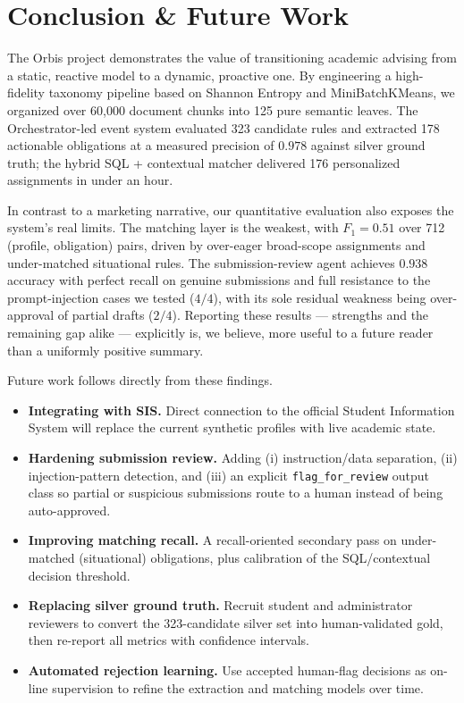 \documentclass[a4paper,12pt]{article}
\begin{document}
\section{Conclusion \& Future Work}
The Orbis project demonstrates the value of transitioning academic advising from a static, reactive model to a dynamic, proactive one. By engineering a high-fidelity taxonomy pipeline based on Shannon Entropy and MiniBatchKMeans, we organized over 60{,}000 document chunks into 125 pure semantic leaves. The Orchestrator-led event system evaluated 323 candidate rules and extracted 178 actionable obligations at a measured precision of $0.978$ against silver ground truth; the hybrid SQL + contextual matcher delivered 176 personalized assignments in under an hour.

In contrast to a marketing narrative, our quantitative evaluation also exposes the system's real limits. The matching layer is the weakest, with $F_1{=}0.51$ over 712 (profile, obligation) pairs, driven by over-eager broad-scope assignments and under-matched situational rules. The submission-review agent achieves $0.938$ accuracy with perfect recall on genuine submissions and full resistance to the prompt-injection cases we tested ($4/4$), with its sole residual weakness being over-approval of partial drafts ($2/4$). Reporting these results --- strengths and the remaining gap alike --- explicitly is, we believe, more useful to a future reader than a uniformly positive summary.

Future work follows directly from these findings.
\begin{itemize}
    \item \textbf{Integrating with SIS.} Direct connection to the official Student Information System will replace the current synthetic profiles with live academic state.
    \item \textbf{Hardening submission review.} Adding (i) instruction/data separation, (ii) injection-pattern detection, and (iii) an explicit \texttt{flag\_for\_review} output class so partial or suspicious submissions route to a human instead of being auto-approved.
    \item \textbf{Improving matching recall.} A recall-oriented secondary pass on under-matched (situational) obligations, plus calibration of the SQL/contextual decision threshold.
    \item \textbf{Replacing silver ground truth.} Recruit student and administrator reviewers to convert the 323-candidate silver set into human-validated gold, then re-report all metrics with confidence intervals.
    \item \textbf{Automated rejection learning.} Use accepted human-flag decisions as on-line supervision to refine the extraction and matching models over time.
\end{itemize}

\clearpage
{}
 
 
\end{document}
